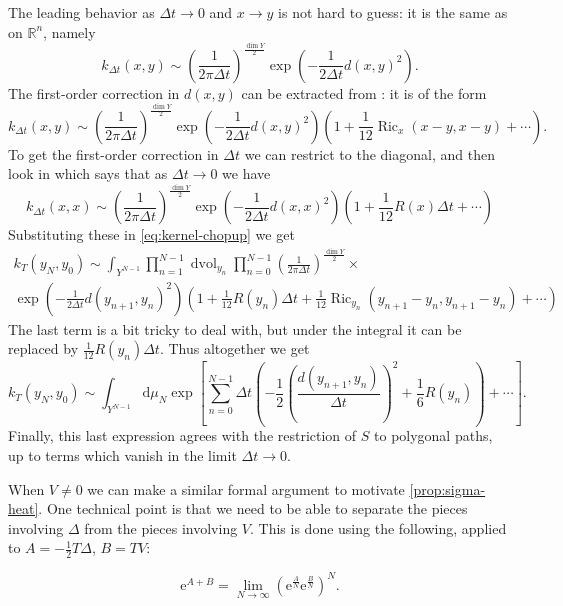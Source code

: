 \documentclass[12pt,letterpaper,reqno]{article}
\numberwithin{equation}{section}
\newcommand{\R}{\ensuremath{\mathbb R}}
\newcommand{\half}{\ensuremath{\frac{1}{2}}}
\newcommand{\e}{{\mathrm e}}
\newcommand{\de}{\mathrm{d}}
\DeclareMathOperator{\dvol}{dvol}
\DeclareMathOperator{\Ric}{Ric}
\newcommand{\fixme}[1]{{\color{orange}{[#1]}}}
\begin{document}
The leading behavior as $\Delta t \to 0$ and $x \to y$ 
is not hard to guess: it is the same as on $\R^n$, namely
\begin{equation}
  k_{\Delta t}(x,y) \sim \left( \frac{1}{2 \pi \Delta t} \right)^{\frac{\dim Y}{2}} \exp \left( - \frac{1}{2 \Delta t} d(x,y)^2 \right).
\end{equation}
The first-order correction in $d(x,y)$ can be extracted from \cite{Berline2004}: it is of the form
\begin{equation}
  k_{\Delta t}(x,y) \sim \left( \frac{1}{2 \pi \Delta t} \right)^{\frac{\dim Y}{2}} \exp \left( - \frac{1}{2 \Delta t} d(x,y)^2 \right) \left( 1 + \frac{1}{12} \Ric_x(x-y,x-y) + \cdots \right).
\end{equation}
To get the first-order correction in $\Delta t$ we can restrict to the diagonal,
and then look in \cite{Roe1988a} which says that 
as $\Delta t \to 0$ we have
\begin{equation}
  k_{\Delta t}(x,x) \sim \left( \frac{1}{2 \pi \Delta t} \right)^{\frac{\dim Y}{2}} \exp \left( - \frac{1}{2 \Delta t} d(x,x)^2 \right) \left( 1 + \frac{1}{12} R(x) \Delta t + \cdots \right)
\end{equation}
Substituting these in \eqref{eq:kernel-chopup} we get
\begin{multline}
  k_T(y_N, y_0) \sim \int_{Y^{N-1}} \prod_{n=1}^{N-1} \dvol_{y_n} \prod_{n=0}^{N-1}\left( \frac{1}{2 \pi \Delta t} \right)^{\frac{\dim Y}{2}} \times \\ 
  \exp \left( - \frac{1}{2 \Delta t} d(y_{n+1},y_n)^2 \right) \left(1 + \frac{1}{12} R(y_n) \Delta t + \frac{1}{12} \Ric_{y_n}(y_{n+1}-y_n,y_{n+1}-y_n) + \cdots \right)
\end{multline}
The last term is a bit tricky to deal with, but under the integral it can be replaced
by $\frac{1}{12} R(y_n) \Delta t$. \fixme{explain how} 
Thus altogether we get
\begin{equation}
 k_T(y_N, y_0)  \sim  \int_{Y^{N-1}} \de \mu_N \exp \left[ \sum_{n=0}^{N-1} \Delta t \left( - \half \left(\frac{d(y_{n+1},y_n)}{\Delta t}\right)^2 + \frac{1}{6} R(y_n) \right) + \cdots \right].
\end{equation}
Finally, this last expression agrees with
the restriction of $S$ to polygonal paths, up to terms which
vanish in the limit $\Delta t \to 0$.

When $V \neq 0$ we can make a similar formal argument to motivate
\autoref{prop:sigma-heat}.
One technical point is that we need to be able to separate
the pieces involving $\Delta$ from the pieces involving $V$.
This is done using the following, 
applied to $A = -\half T \Delta$, $B = T V$:
\begin{prop} \label{prop:trotter}
\fixme{with appropriate functional analytic hypothesis}
\begin{equation}
  \e^{A+B} = \lim_{N \to \infty} \left(\e^{\frac{A}{N}} \e^{\frac{B}{N}}\right)^N.
\end{equation}
\end{prop}
\end{document}
